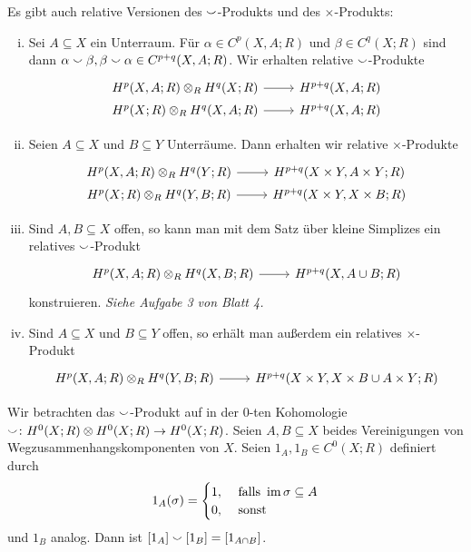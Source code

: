 \begin{bemerkung}[{name=[relative Versionen des Cup- und Kreuz-Produktes]}]
	Es gibt auch relative Versionen des $\cupp$-Produkts und des $\times$-Produkts:
	\begin{enumerate}[(i)]
		\item Sei $A \subseteq X$ ein Unterraum. 
		Für $\alpha \in C^p(X,A;R)$ und $\beta \in C^q(X;R)$ sind dann $\alpha \cupp \beta, \beta \cupp \alpha \in C^{p+q}(X,A;R)$. 
		Wir erhalten relative $\cupp$-Produkte
		\[
			\begin{tikzcd}[row sep=0em]
				H^p(X,A;R) \otimes_R H^q(X;R) \rar & \minwidthbox{H^{p+q}(X,A;R)}{2cm} \\
				H^p(X;R) \otimes_R H^q(X,A;R) \rar & \minwidthbox{H^{p+q}(X,A;R)}{2cm} 
			\end{tikzcd}
		\]
		\item Seien $A \subseteq X$ und $B \subseteq Y$ Unterräume.
		Dann erhalten wir relative $\times$-Produkte
		\[
			\begin{tikzcd}[row sep=0em]
				H^p(X,A;R) \otimes_R H^q(Y;R) \rar & H^{p+q}(X \times Y, A \times Y;R) \\
				H^p(X;R) \otimes_R H^q(Y,B;R) \rar & H^{p+q}(X \times Y,X \times B;R) 
			\end{tikzcd}
		\]
		\item Sind $A,B \subseteq X$ offen, so kann man mit dem Satz über kleine Simplizes ein relatives $\cupp$-Produkt
		\[
			\begin{tikzcd}
				H^p(X,A;R) \otimes_R H^q(X,B;R) \rar & H^{p+q}(X,A \cup B;R)
			\end{tikzcd}
		\]
		konstruieren. \emph{Siehe Aufgabe 3 von Blatt 4.}
		\item Sind $A \subseteq X$ und $B \subseteq Y$ offen, so erhält man außerdem ein relatives $\times$-Produkt
		\[
			\begin{tikzcd}
				H^p(X,A;R) \otimes_R H^q(Y,B;R) \rar & H^{p+q}(X \times Y,X \times B \cup A \times Y;R)
			\end{tikzcd}
		\]
	\end{enumerate}
\end{bemerkung}

\begin{beispiel}[{name=[Cup-Produkt in der $0$-ten Kohomologie]}]
	Wir betrachten das $\cupp$-Produkt auf in der $0$-ten Kohomologie $\cupp \colon H^0(X;R) \otimes H^0(X;R) \to H^0(X;R)$. 
	Seien $A,B \subseteq X$ beides Vereinigungen von Wegzusammenhangskomponenten von $X$. 
	Seien $1_A, 1_B \in C^0(X;R)$ definiert durch 
	\[
		1_A(\sigma) = \begin{cases}
			1, &\text{ falls } \im \sigma \subseteq A\\
			0 , & \text{ sonst} 
		\end{cases}
	\]
	und $1_B$ analog. Dann ist $\benbrace*{1_A} \cupp \benbrace*{1_B} = \benbrace*{1_{A \cap B}}$.
\end{beispiel}


